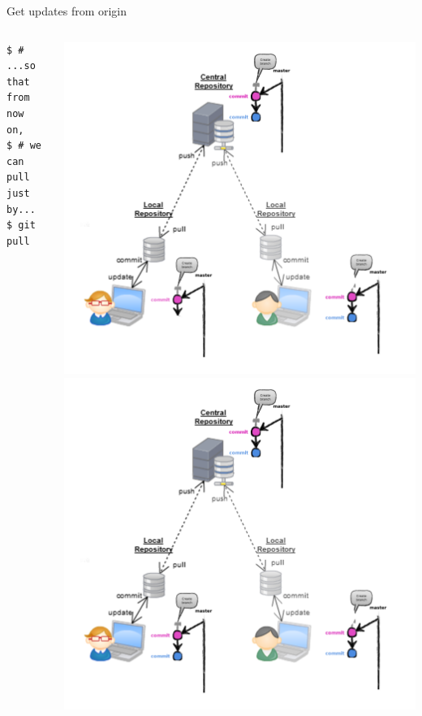 \begin{frame}[fragile]{Get updates from origin}
\begin{columns}
\begin{column}{0.4\textwidth}
\begin{lstlisting}
$ # ...so that from now on, 
$ # we can pull just by...
$ git pull
	\end{lstlisting}
	\end{column}
	\begin{column}{0.6\textwidth}
		\begin{center}
			 {
				\includegraphics[width=.9\textwidth]{multiuser_they_push.png}
			}\only<3-> {
				\includegraphics[width=.9\textwidth]{multiuser_pull.png}
			}
		\end{center}
	\end{column}
\end{columns}
\end{frame}


